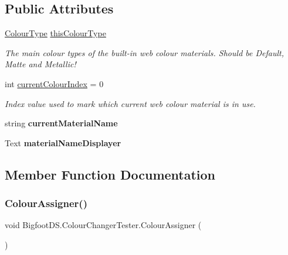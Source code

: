 \subsection*{Public Attributes}
\begin{DoxyCompactItemize}
\item 
\mbox{\hyperlink{namespace_bigfoot_d_s_abbe5e74a13ceee1200fe8df86775491b}{Colour\+Type}} \mbox{\hyperlink{class_bigfoot_d_s_1_1_colour_changer_tester_ab7fcdc500194580a3d2881be60ba2079}{this\+Colour\+Type}}
\begin{DoxyCompactList}\small\item\em The main colour types of the built-\/in web colour materials. Should be Default, Matte and Metallic! \end{DoxyCompactList}\item 
int \mbox{\hyperlink{class_bigfoot_d_s_1_1_colour_changer_tester_aa4dfb28508c536b6aeb95261415c64a6}{current\+Colour\+Index}} = 0
\begin{DoxyCompactList}\small\item\em Index value used to mark which current web colour material is in use. \end{DoxyCompactList}\item 
\mbox{\label{class_bigfoot_d_s_1_1_colour_changer_tester_a7ac564ac5150e1cfadf622d9fc802e36}} 
string {\bfseries current\+Material\+Name}
\item 
\mbox{\label{class_bigfoot_d_s_1_1_colour_changer_tester_a0dc48d1ef7ec4251172cd3a8f9469f7f}} 
Text {\bfseries material\+Name\+Displayer}
\end{DoxyCompactItemize}


\subsection{Member Function Documentation}
\mbox{\label{class_bigfoot_d_s_1_1_colour_changer_tester_a723b8d8bcccfccd194319e4ea608e821}} 
\subsubsection{\texorpdfstring{Colour\+Assigner()}{ColourAssigner()}}
{\footnotesize\ttfamily void Bigfoot\+D\+S.\+Colour\+Changer\+Tester.\+Colour\+Assigner (\begin{DoxyParamCaption}{ }\end{DoxyParamCaption})}



